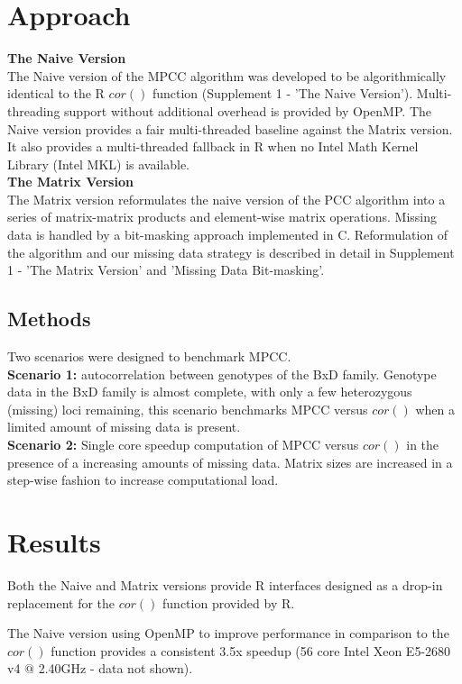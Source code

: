 \documentclass{bioinfo}
\begin{document}
\section{Approach}
\textbf{The Naive Version}\\
The Naive version of the MPCC algorithm was developed to be algorithmically identical 
to the R $cor()$ function (Supplement 1 - 'The Naive Version'). Multi-threading 
support without additional overhead is provided by OpenMP. The Naive version 
provides a fair multi-threaded baseline against the Matrix version. It also provides 
a multi-threaded fallback in R when no Intel\textregistered{} Math Kernel Library 
(Intel\textregistered{} MKL) is available.\\
\textbf{The Matrix Version}\\
The Matrix version reformulates the naive version of the PCC algorithm 
into a series of matrix-matrix products and element-wise matrix operations. 
Missing data is handled by a bit-masking approach implemented in C. 
Reformulation of the algorithm and our missing data strategy is described 
in detail in Supplement 1 - 'The Matrix Version' and 'Missing Data Bit-masking'. 
\vspace*{-5mm}
\begin{methods}
\section{Methods}
Two scenarios were designed to benchmark MPCC.\\
{\bf Scenario 1:} autocorrelation between genotypes of the BxD family. 
Genotype data in the BxD family is almost complete, with only a few heterozygous 
(missing) loci remaining, this scenario benchmarks MPCC versus $cor()$ when a limited 
amount of missing data is present.\\
{\bf Scenario 2:} Single core speedup computation of MPCC versus $cor()$ in the 
presence of a increasing amounts of missing data. Matrix sizes are increased in a 
step-wise fashion to increase computational load.
\end{methods}
\vspace*{-2mm}
\section{Results}
Both the Naive and Matrix versions provide R interfaces designed as a drop-in 
replacement for the $cor()$ function provided by R.

The Naive version using OpenMP to improve performance in comparison to the 
$cor()$ function provides a consistent 3.5x speedup (56 core Intel Xeon E5-2680 
v4 $@$ 2.40GHz - data not shown).
\end{document}
